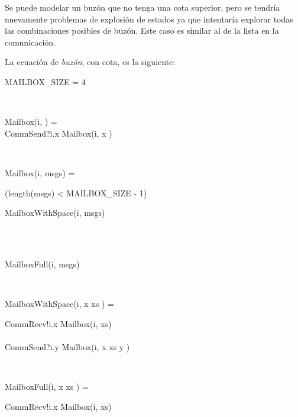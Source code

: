 Se puede modelar un buzón que no tenga una cota superior, pero se tendría nuevamente problemas de explosión de estados ya que \FDR intentaría explorar todas las combinaciones posibles de buzón. Este caso es similar al de la lista en la comunicación. 

La ecuación de \textit{buzón}, con cota, es la siguiente:

\begin{process}

\begin{block}
MAILBOX\_SIZE = 4
\end{block} \\

\begin{block}
Mailbox(i, \nil) = {} \\ \quad
CommSend?i.x \then Mailbox(i, \lseq x \rseq) 
\end{block} \\

\begin{block}
Mailbox(i, msgs) = {} \\ \quad
  \begin{block} 
  \If (length(msgs) < MAILBOX\_SIZE - 1) \Then {} \\ \quad
    \begin{block} 
      MailboxWithSpace(i, msgs)
    \end{block} \\
  \Else {} \\ \quad
    \begin{block}
      MailboxFull(i, msgs)
    \end{block}
  \end{block} 
\end{block} \\

\begin{block}
MailboxWithSpace(i, \lseq x \rseq \cat xs ) = {} \\ \quad 
  \begin{block}
    CommRecv!i.x \then Mailbox(i, xs) \\
    \Extchoice \\
    CommSend?i.y \then Mailbox(i, \lseq x \rseq \cat xs \cat \lseq y \rseq ) 
  \end{block}
\end{block} \\

\begin{block}
MailboxFull(i, \lseq x \rseq \cat xs ) = {} \\ \quad 
  \begin{block}
    CommRecv!i.x \then Mailbox(i, xs) \\
  \end{block}
\end{block} \\
\end{process}

